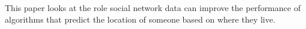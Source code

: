 \documentclass{article}
\begin{document}
This paper looks at the role social network data can improve the performance of algorithms that predict the location of someone based on where they live.
\end{document}
